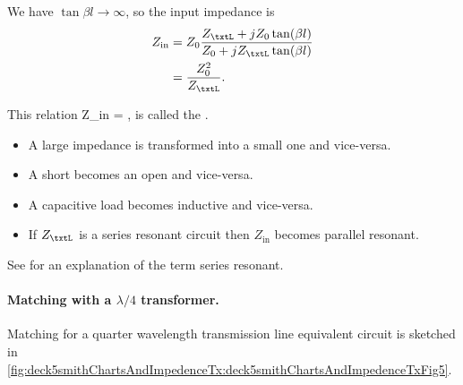 We have \( \tan \beta l \rightarrow \infty \), so the input impedance is
\begin{equation}\label{eqn:uwavesDeck5SmithChartCore:240}
\begin{aligned}
Z_{\textrm{in}}
&= Z_0 \frac{ Z_\txtL + j Z_0 \tan(\beta l) }{ Z_0 + j Z_\txtL \tan(\beta l)}
\\ &= \frac{Z_0^2}{Z_\txtL}.
\end{aligned}
\end{equation}

This relation
{
Z_{\textrm{in}}
= ,
}
is called the .

\begin{itemize}
\item A large impedance is transformed into a small one and vice-versa.
\item A short becomes an open and vice-versa.
\item A capacitive load becomes inductive and vice-versa.
\item If \( Z_\txtL \) is a series resonant circuit then \( Z_{\textrm{in}} \) becomes parallel resonant.
\end{itemize}

See \citep{seriesResonance} for an explanation of the term series resonant.

\paragraph{Matching with a \( \lambda/4 \) transformer.}

Matching for a quarter wavelength transmission line equivalent circuit is sketched in \cref{fig:deck5smithChartsAndImpedenceTx:deck5smithChartsAndImpedenceTxFig5}.


